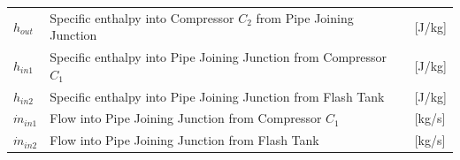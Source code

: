 \begin{center}
	\begin{tabular}{l p{10cm} l}
		$h_{out}$       & Specific enthalpy into Compressor $ C_2 $ from Pipe Joining Junction & [\si{J}/\si{kg}] \\
		$h_{in1}$       & Specific enthalpy into Pipe Joining Junction from Compressor $ C_1 $ & [\si{J}/\si{kg}] \\
		$h_{in2}$       & Specific enthalpy into Pipe Joining Junction from Flash Tank         & [\si{J}/\si{kg}] \\
		$\dot{m}_{in1}$ & Flow into Pipe Joining Junction from Compressor $ C_1 $              & [\si{kg}/\si{s}] \\
		$\dot{m}_{in2}$ & Flow into Pipe Joining Junction from Flash Tank                      & [\si{kg}/\si{s}]
	\end{tabular}
\end{center}




